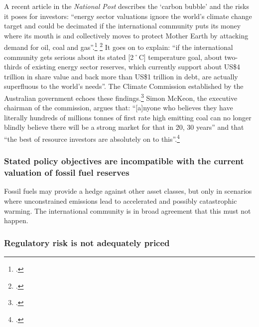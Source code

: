 A recent article in the \emph{National Post} describes the `carbon bubble' and the risks it poses for investors: ``energy sector valuations ignore the world's climate change target and could be decimated if the international community puts its money where its mouth is and collectively moves to protect Mother Earth by attacking demand for oil, coal and gas''.\footcite[][]{OilGiantsMajorPain} \footcite[See also: ][]{TimelyIssue}
It goes on to explain: ``if the international community gets serious about its stated [2˚C] temperature goal, about two-thirds of existing energy sector reserves, which currently support about US\$4 trillion in share value and back more than US\$1 trillion in debt, are actually superfluous to the world's needs''.
The Climate Commission established by the Australian government echoes these findings.\footcite[][]{CriticalDecade2013}
Simon McKeon, the executive chairman of the commission, argues that: ``[a]nyone who believes they have literally hundreds of millions tonnes of first rate high emitting  coal can no longer blindly believe there will be a strong market for that in 20, 30 years'' and that ``the best of resource investors are absolutely on to this''.\footcite[][]{CoalWillBeLeft}



	\subsubsection {Stated policy objectives are incompatible with the current valuation of fossil fuel reserves}



Fossil fuels may provide a hedge against other asset classes, but only in scenarios where unconstrained emissions lead to accelerated and possibly catastrophic warming. 
The international community is in broad agreement that this must not happen.



	\subsubsection {Regulatory risk is not adequately priced} 



